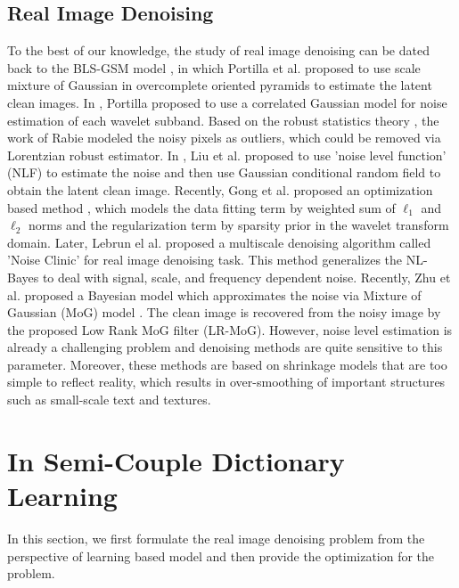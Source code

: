 \documentclass[10pt,twocolumn,letterpaper]{article}
\begin{document}
\subsection{Real Image Denoising}
To the best of our knowledge, the study of real image denoising can be dated back to the BLS-GSM model \cite{blsgsm}, in which Portilla et al. proposed to use scale mixture of Gaussian in overcomplete oriented pyramids to estimate the latent clean images. In \cite{fullyblind}, Portilla proposed to use a correlated Gaussian model for noise estimation of each wavelet subband. Based on the robust statistics theory \cite{huber2011robust}, the work of Rabie \cite{rabie2005robust} modeled the noisy pixels as outliers, which could be removed via Lorentzian robust estimator. In \cite{Liu2008}, Liu et al. proposed to use 'noise level function' (NLF) to estimate the noise and then use Gaussian conditional random field to obtain the latent clean image. Recently, Gong et al. proposed an optimization based method \cite{almapg}, which models the data fitting term by weighted sum of $\ell_{1}$ and $\ell_{2}$ norms and the regularization term by sparsity prior in the wavelet transform domain. Later, Lebrun el al. proposed a multiscale denoising algorithm called 'Noise Clinic' \cite{noiseclinic} for real image denoising task. This method generalizes the NL-Bayes \cite{nlbayes} to deal with signal, scale, and frequency dependent noise. Recently, Zhu et al. proposed a Bayesian model \cite{Zhu_2016_CVPR} which approximates the noise via Mixture of Gaussian (MoG) model \cite{Bishop}. The clean image is recovered from the noisy image by the proposed Low Rank MoG filter (LR-MoG). However, noise level estimation is already a challenging problem and denoising methods are quite sensitive to this parameter. Moreover, these methods are based on shrinkage models that are too simple to reflect reality, which results in over-smoothing of important structures such as small-scale text and textures. 

\section{In Semi-Couple Dictionary Learning}
In this section, we first formulate the real image denoising problem from the perspective of learning based model and then provide the optimization for the problem.
\end{document}
